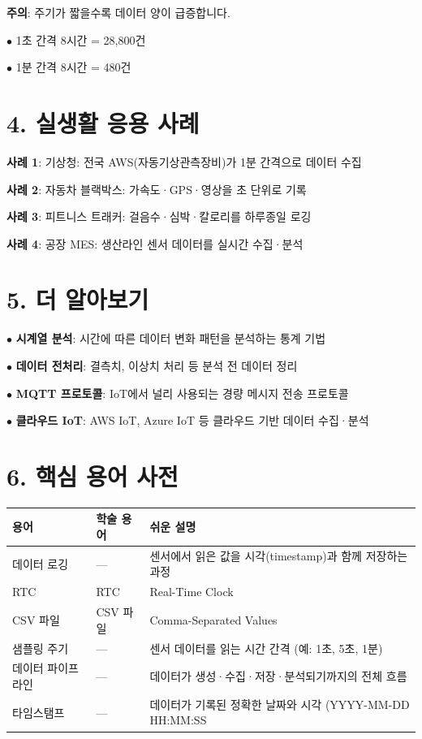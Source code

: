 \documentclass[11pt,a4paper]{article}
\begin{document}
\textbf{주의}: 주기가 짧을수록 데이터 양이 급증합니다.

$\bullet$ 1초 간격 \texttimes{} 8시간 = 28,800건

$\bullet$ 1분 간격 \texttimes{} 8시간 = 480건



\section*{4. 실생활 응용 사례}

\textbf{사례 1}: 기상청: 전국 AWS(자동기상관측장비)가 1분 간격으로 데이터 수집


\textbf{사례 2}: 자동차 블랙박스: 가속도·GPS·영상을 초 단위로 기록


\textbf{사례 3}: 피트니스 트래커: 걸음수·심박·칼로리를 하루종일 로깅


\textbf{사례 4}: 공장 MES: 생산라인 센서 데이터를 실시간 수집·분석



\section*{5. 더 알아보기}

$\bullet$ \textbf{시계열 분석}: 시간에 따른 데이터 변화 패턴을 분석하는 통계 기법

$\bullet$ \textbf{데이터 전처리}: 결측치, 이상치 처리 등 분석 전 데이터 정리

$\bullet$ \textbf{MQTT 프로토콜}: IoT에서 널리 사용되는 경량 메시지 전송 프로토콜

$\bullet$ \textbf{클라우드 IoT}: AWS IoT, Azure IoT 등 클라우드 기반 데이터 수집·분석



\section*{6. 핵심 용어 사전}

\begin{center}
\renewcommand{\arraystretch}{1.4}
\begin{tabular}{|p{3.1cm}|p{1.7cm}|p{10.2cm}|}
\hline
\rowcolor{tableheader}
\textbf{용어} & \textbf{학술 용어} & \textbf{쉬운 설명} \\
\hline
데이터 로깅 & — & 센서에서 읽은 값을 시각(timestamp)과 함께 저장하는 과정 \\
\hline
RTC & RTC & Real-Time Clock \\
\hline
CSV 파일 & CSV 파일 & Comma-Separated Values \\
\hline
샘플링 주기 & — & 센서 데이터를 읽는 시간 간격 (예: 1초, 5초, 1분) \\
\hline
데이터 파이프라인 & — & 데이터가 생성·수집·저장·분석되기까지의 전체 흐름 \\
\hline
타임스탬프 & — & 데이터가 기록된 정확한 날짜와 시각 (YYYY-MM-DD HH:MM:SS \\
\hline
\end{tabular}
\end{center}
\end{document}
